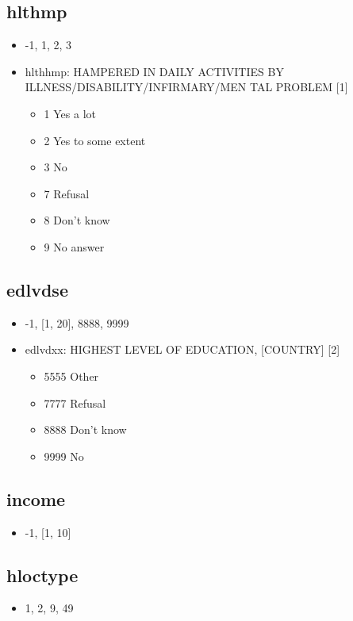 \documentclass[12pt]{article}
\begin{document}
\subsection{hlthmp}
\begin{itemize}
\item -1, 1, 2, 3
\item hlthhmp: HAMPERED IN DAILY ACTIVITIES BY ILLNESS/DISABILITY/INFIRMARY/MEN
TAL PROBLEM [1]
\begin{itemize}
\item 1 Yes a lot 
\item 2 Yes to some extent 
\item 3 No                                                          
\item 7 Refusal                                            
\item 8 Don’t know 
\item 9 No answer 
\end{itemize}
\end{itemize}

\subsection{edlvdse}
\begin{itemize}
\item -1, [1, 20], 8888, 9999
\item edlvdxx: HIGHEST LEVEL OF EDUCATION, [COUNTRY] [2]
\begin{itemize}
\item 5555 Other
\item 7777 Refusal
\item 8888 Don’t know                                
\item 9999 No              
\end{itemize}
\end{itemize}

\subsection{income}
\begin{itemize}
\item -1, [1, 10]
\end{itemize}

\subsection{hloctype}
\begin{itemize}
\item 1, 2, 9, 49
\end{itemize}
\end{document}
